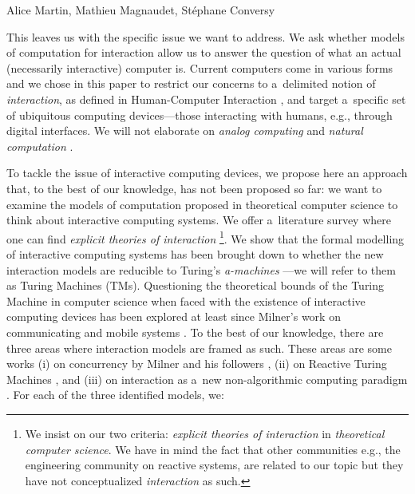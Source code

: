 \begin{artengenv2auth}{Alice Martin, Mathieu Magnaudet, Stéphane Conversy}

This leaves us with the specific issue we want to address. We ask whether models of computation for interaction allow us to answer the question of what an actual (necessarily interactive) computer is. Current computers come in various forms and we chose in this paper to restrict our concerns to a~delimited notion of \textit{interaction}, as defined in Human-Computer Interaction \parencite{Myers1994, Dearden1997, Beaudouin-Lafon2006,  Hornbaek2017, Basman2018}, and target a~specific set of ubiquitous computing devices---those interacting with humans, e.g., through digital interfaces. We will not elaborate on \textit{analog computing} \parencite{Bielecki2019} and \textit{natural computation} \parencite{Dodig-Crnkovic2011, MacLennan2003}. 

To tackle the issue of interactive computing devices, we propose here an approach that, to the best of our knowledge, has not been proposed so far: we want to examine the models of computation proposed in theoretical computer science to think about interactive computing systems. We offer a~literature survey where one can find \textit{explicit theories of interaction} \footnote{We insist on our two criteria: \textit{explicit theories of interaction} in \textit{theoretical computer science}. We have in mind the fact that other communities e.g., the engineering community on reactive systems, are related to our topic but they have not conceptualized \textit{interaction} as such.}. We show that the formal modelling of interactive computing systems has been brought down to whether the new interaction models are reducible to Turing’s \emph{a-machines} \parencite{Turing1937}---we will refer to them as Turing Machines (TMs). 
Questioning the theoretical bounds of the Turing Machine in computer science when faced with the existence of interactive computing devices has been explored at least since Milner's work on communicating and mobile systems \parencite{Milner1993, Milner1999}. To the best of our knowledge, there are three areas where interaction models are framed as such. These areas are some works (i) on concurrency by Milner and his followers \parencite{Milner1999, Milner2006}, (ii) on Reactive Turing Machines \parencite{Andersen1997, Baeten2013, VanLeeuwen2001, VanLeeuwen2006}, and (iii) on interaction as a~new non-algorithmic computing paradigm \parencite{Goldin2006, Wegner1997, Wegner2003}. For each of the three identified models, we:


\end{artengenv2auth}
